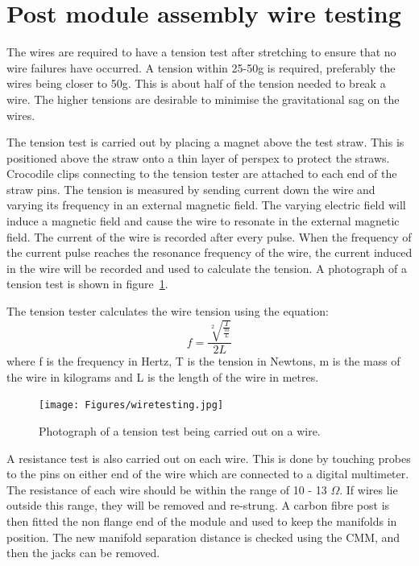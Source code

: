\section{Post module assembly wire testing}

The wires are required to have a tension test after stretching to ensure that no wire failures have occurred. A tension within 25-50g is required, preferably the wires being closer to 50g. This is about half of the tension needed to break a wire. The higher tensions are desirable to minimise the gravitational sag on the wires.

The tension test is carried out by placing a magnet above the test straw. This is positioned above the straw onto a thin layer of perspex to protect the straws. Crocodile clips connecting to the tension tester are attached to each end of the straw pins. The tension is measured by sending current down the wire and varying its frequency in an external magnetic field. The varying electric field will induce a magnetic field and cause the wire to resonate in the external magnetic field. The current of the wire is recorded after every pulse. When the frequency of the current pulse reaches the resonance frequency of the wire, the current induced in the wire will be recorded and used to calculate the tension. A photograph of a tension test is shown in figure~\ref{fig:wiretesting}.

The tension tester calculates the wire tension using the equation: 
\begin{equation}
f=\frac{\sqrt[2]{\frac{T}{\frac{m}{L}}}}{2L}
\end{equation}
where f is the frequency in Hertz, T is the tension in Newtons, m is the mass of the wire in kilograms and L is the length of the wire in metres. 

\begin{figure}[ht]
\centering 
\texttt{[image: Figures/wiretesting.jpg]}
\decoRule
\caption{Photograph of a tension test being carried out on a wire.}
\label{fig:wiretesting}
\end{figure}

A resistance test is also carried out on each wire. This is done by touching probes to the pins on either end of the wire which are connected to a digital multimeter. The resistance of each wire should be within the range of 10 - 13 $\Omega$. If wires lie outside this range, they will be removed and re-strung. A carbon fibre post is then fitted the non flange end of the module and used to keep the manifolds in position. The new manifold separation distance is checked using the CMM, and then the jacks can be removed.

